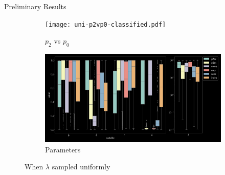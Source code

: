 \documentclass[aspectratio=169,9pt]{beamer}
\begin{document}
\begin{frame}{Preliminary Results}
    \begin{figure}[h]
        \begin{adjustwidth}{-5cm}{-5cm}
          \centering
          \begin{subfigure}[b]{0.33\textwidth}
            \centering
            \texttt{[image: uni-p2vp0-classified.pdf]}
            \caption{$p_2$ vs $p_0$}
          \end{subfigure}
          \begin{subfigure}[b]{0.66\textwidth}
            \centering
            \includegraphics[width=\textwidth]{uni-parms.pdf}
            \caption{Parameters}
          \end{subfigure}
        \end{adjustwidth}
        \caption{When $\lambda$ sampled uniformly}
      \end{figure}
\end{frame}
\end{document}

